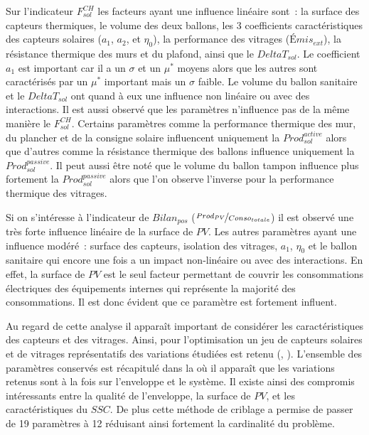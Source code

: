 Sur l’indicateur $F_{sol}^{CH}$ les facteurs ayant une influence linéaire sont~: la
surface des capteurs thermiques, le volume des deux ballons, les \num{3} coefficients
caractéristiques des capteurs solaires ($a_{1}$, $a_{2}$, et $\eta_{0}$), la performance
des vitrages ($Émis_{ext}$), la résistance thermique des murs et du plafond, ainsi que le
$DeltaT_{sol}$. Le coefficient $a_{1}$ est important car il a un $\sigma$ et un $\mu^{*}$
moyens alors que les autres sont caractérisés par un $\mu^{*}$ important mais un $\sigma$
faible. Le volume du ballon sanitaire et le $DeltaT_{sol}$ ont quand à eux une influence
non linéaire ou avec des interactions.
Il est aussi observé que les paramètres n’influence pas de la même manière le $F_{sol}^{CH}$.
Certains paramètres comme la performance thermique des mur, du plancher et de la consigne solaire
influencent uniquement la $Prod_{sol}^{active}$ alors que
d’autres comme la résistance thermique des ballons influence uniquement la $Prod_{sol}^{passive}$.
Il peut aussi être noté que le volume du ballon tampon influence plus fortement la
$Prod_{sol}^{passive}$ alors que l’on observe l’inverse pour la performance thermique
des vitrages.


Si on s’intéresse à l’indicateur de $Bilan_{pos}$ ($\nicefrac{Prod_{PV}}{Conso_{totale}}$)
il est observé une très forte influence linéaire de la surface de $PV$. Les autres paramètres
ayant une influence modéré~: surface des capteurs, isolation des vitrages, $a_{1}$, $\eta_{0}$
et le ballon sanitaire qui encore une fois a un impact non-linéaire ou avec des interactions.
En effet, la surface de $PV$ est le seul facteur permettant de couvrir les consommations
électriques des équipements internes qui représente la majorité des consommations. Il est donc
évident que ce paramètre est fortement influent.


Au regard de cette analyse il apparaît important de considérer les caractéristiques des capteurs et
des vitrages. Ainsi, pour l’optimisation un jeu de capteurs solaires et de vitrages représentatifs
des variations étudiées est retenu (, ).
L’ensemble des paramètres conservés est récapitulé dans la  où il
apparaît que les variations retenus sont à la fois sur l’enveloppe et le système.
Il existe ainsi des compromis intéressants entre la qualité de l’enveloppe, la surface de $PV$, et
les caractéristiques du $SSC$. De plus cette méthode de criblage a permise de passer de
\num{19} paramètres à \num{12} réduisant ainsi fortement la cardinalité du problème.



